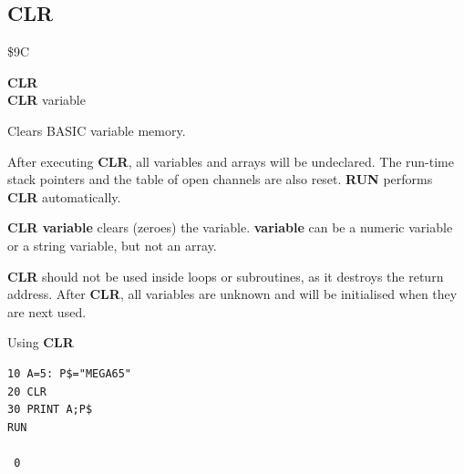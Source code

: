 \subsection{CLR}
\begin{description}[leftmargin=2cm,style=nextline]
\item [Token:] \$9C
\item [Format:] {\bf CLR} \\
                {\bf CLR} variable
\item [Usage:] Clears BASIC variable memory.

               After executing {\bf CLR}, all variables and arrays will be undeclared.
               The run-time stack pointers
               and the table of open channels are also reset.
               {\bf RUN} performs {\bf CLR} automatically.

               {\bf CLR variable} clears (zeroes) the variable.
               {\bf variable} can be a numeric variable or a string variable, but not
               an array.

\item [Remarks:] {\bf CLR} should not be used inside loops or
               subroutines, as it destroys the return address.
               After {\bf CLR}, all variables are unknown and will
               be initialised when they are next used.

\item [Example:] Using {\bf CLR}
\begin{tcolorbox}[colback=black,coltext=white]
\verbatimfont{\codefont}
\begin{verbatim}
10 A=5: P$="MEGA65"
20 CLR
30 PRINT A;P$
RUN

 0
\end{verbatim}
\end{tcolorbox}
\end{description}


\newpage
